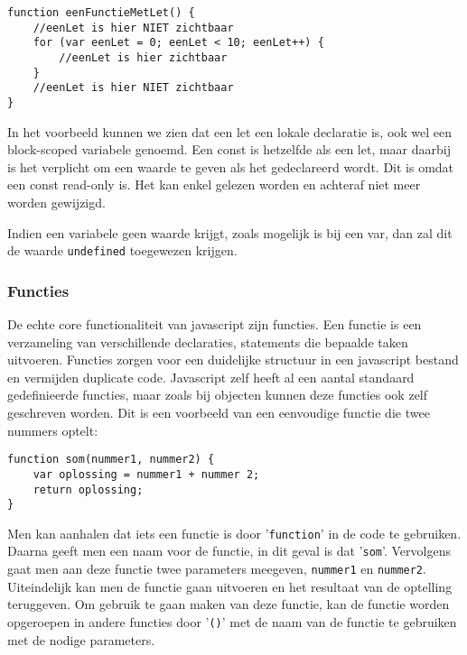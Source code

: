 \begin{lstlisting}[frame=single, caption=Een functie met let]
function eenFunctieMetLet() {
	//eenLet is hier NIET zichtbaar
	for (var eenLet = 0; eenLet < 10; eenLet++) {
		//eenLet is hier zichtbaar
	}
	//eenLet is hier NIET zichtbaar
}
\end{lstlisting}

In het voorbeeld kunnen we zien dat een let een lokale declaratie is, ook wel een block-scoped variabele genoemd. Een const is hetzelfde als een let, maar daarbij is het verplicht om een waarde te geven als het gedeclareerd wordt. Dit is omdat een const read-only is. Het kan enkel gelezen worden en achteraf niet meer worden gewijzigd.

Indien een variabele geen waarde krijgt, zoals mogelijk is bij een var, dan zal dit de waarde \lstinline[basicstyle=\ttfamily\color{red}]|undefined| toegewezen krijgen.

\subsubsection{Functies}
\label{sssec:functies}
De echte core functionaliteit van javascript zijn functies. Een functie is een verzameling van verschillende declaraties, statements die bepaalde taken uitvoeren. Functies zorgen voor een duidelijke structuur in een javascript bestand en vermijden duplicate code. Javascript zelf heeft al een aantal standaard gedefinieerde functies, maar zoals bij objecten kunnen deze functies ook zelf geschreven worden. Dit is een voorbeeld van een eenvoudige functie die twee nummers optelt:

\begin{lstlisting}[frame=single, caption=Een functie die twee getallen optelt]
function som(nummer1, nummer2) {
	var oplossing = nummer1 + nummer 2;
	return oplossing;
}
\end{lstlisting}

Men kan aanhalen dat iets een functie is door '\lstinline[basicstyle=\ttfamily\color{red}]|function|' in de code te gebruiken. Daarna geeft men een naam voor de functie, in dit geval is dat '\lstinline[basicstyle=\ttfamily\color{red}]|som|'. Vervolgens gaat men aan deze functie twee parameters meegeven, \lstinline[basicstyle=\ttfamily\color{red}]|nummer1| en \lstinline[basicstyle=\ttfamily\color{red}]|nummer2|. Uiteindelijk kan men de functie gaan uitvoeren en het resultaat van de optelling teruggeven. Om gebruik te gaan maken van deze functie, kan de functie worden opgeroepen in andere functies door '\lstinline[basicstyle=\ttfamily\color{red}]|()|' met de naam van de functie te gebruiken met de nodige parameters.


